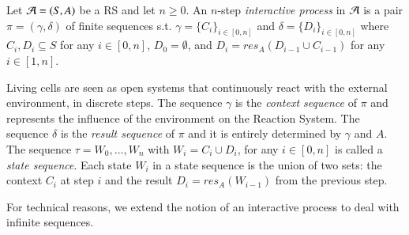 \begin{definition}
Let ${\cal A} = (S, A)$ be a RS and let $n \geq 0$. 
An $n$-step
\emph{interactive process} in ${\cal A}$ is a pair $\pi = (\gamma, \delta)$ of 
finite sequences s.t.
%
$ \gamma=\{C_i\}_{i\in[0,n]}$  and $\delta=\{D_i\}_{i\in[0,n]} $
where 
$ C_{i}, D_{i}  \subseteq S$ for any $i\in[0,n]$, $D_0 = \emptyset$, and 
$D_i =  \mathit{res}_{A}(D_{i-1} \cup C_{i-1})$ for any $i \in [1,n]$.
\end{definition}

Living cells are seen as open systems that continuously react with 
the external environment, in discrete steps. 
The sequence $\gamma$ is the {\em context sequence} of $\pi$ and 
represents the influence of the environment on the Reaction System.
The sequence $\delta$ is
the {\em result sequence} of $\pi$ and it is entirely determined by $\gamma$ and $A$.
%
The sequence $\tau = W_{0}, \ldots, W_{n}$ with $W_{i} = C_{i} \cup D_{i}$, 
for any $i \in [0, n]$
is called a \emph{state sequence}.
%
Each state $W_{i}$ in a state sequence
is the union of two sets: the context $C_{i}$
at step $i$ and the result $D_i=\mathit{res}_{A}(W_{i-1})$ from the previous step.

%
%


For technical reasons, we extend the notion of an interactive process to deal with 
infinite sequences.

